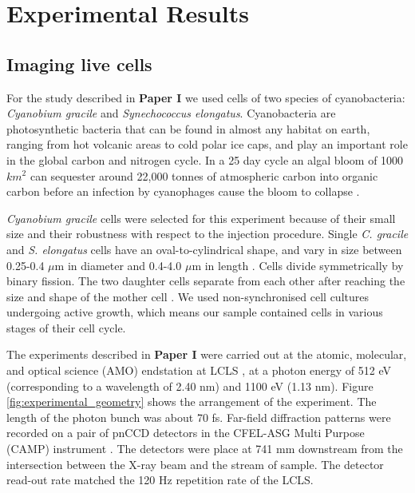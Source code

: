 \chapter{Experimental Results}
\section{Imaging live cells}
For the study described in \textbf{Paper I} we used cells of two species of cyanobacteria: \textit{Cyanobium gracile} and \textit{Synechococcus elongatus}. Cyanobacteria are photosynthetic bacteria that can be found in almost any habitat on earth, ranging from hot volcanic areas to cold polar ice caps, and play an important role in the global carbon and nitrogen cycle. In a 25 day cycle an algal bloom of 1000 $km^2$ can sequester around 22,000 tonnes of atmospheric carbon into organic carbon before an infection by cyanophages cause the bloom to collapse \cite{Lehahn2014}.
 
\textit{Cyanobium gracile} cells were selected for this experiment because of their small size and their robustness with respect to the injection procedure. Single \textit{C. gracile} and \textit{S. elongatus} cells have an oval-to-cylindrical shape, and vary in size between 0.25-0.4 $\mu$m in diameter and 0.4-4.0 $\mu$m in length \cite{Komarek1999}. Cells divide symmetrically by binary fission. The two daughter cells separate from each other after reaching the size and shape of the mother cell \cite{Bazire1988}. We used non-synchronised cell cultures undergoing active growth, which means our sample contained cells in various stages of their cell cycle. 

The experiments described in \textbf{Paper I} were carried out at the atomic, molecular, and optical science (AMO) endstation at LCLS \cite{Bostedt2013}, at a photon energy of 512 eV (corresponding to a wavelength of 2.40 nm) and 1100 eV (1.13 nm). Figure \ref{fig:experimental_geometry} shows the arrangement of the experiment. The length of the photon bunch was about 70 fs. Far-field diffraction patterns were recorded on a pair of pnCCD detectors \cite{Struder2010} in the CFEL-ASG Multi Purpose (CAMP) instrument \cite{Struder2010}. The detectors were place at 741 mm downstream from the intersection between the X-ray beam and the stream of sample. The detector read-out rate matched the 120 Hz repetition rate of the LCLS. 

